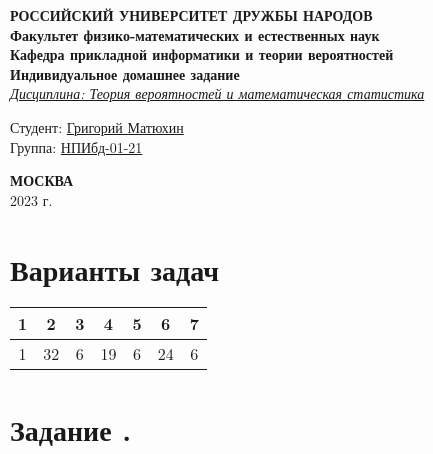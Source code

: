 \documentclass[12pt]{article}
\begin{document}
\begin{titlepage}

	\begin{center}
		\hfill \break
		\textbf{
			\large{РОССИЙСКИЙ УНИВЕРСИТЕТ ДРУЖБЫ НАРОДОВ}\\
			\normalsize{Факультет физико-математических и естественных наук}\\
			\normalsize{Кафедра прикладной информатики и теории вероятностей}\\
		}
		\vspace*{\fill}
		\Large{\textbf{Индивидуальное домашнее задание }}
		\\
		\underline{\textit{\normalsize{Дисциплина: Теория вероятностей и математическая статистика}}}
		\vspace*{\fill}

	\end{center}

	\begin{flushright}
		Студент: \underline{Григорий Матюхин}\\ \vspace{0.5cm}
		Группа: \underline{НПИбд-01-21}
	\end{flushright}


	\begin{center} \textbf{МОСКВА} \\ 2023 г. \end{center}
	\thispagestyle{empty} %

\end{titlepage}
\newpage
\tableofcontents
\newpage

\section{Варианты задач}

\begin{tabular}{|c|c|c|c|c|c|c|}
	\hline
	1 & 2  & 3 & 4  & 5 & 6  & 7 \\
	\hline
	1 & 32 & 6 & 19 & 6 & 24 & 6 \\
	\hline
\end{tabular}

\section*{Задание .}
\end{document}

